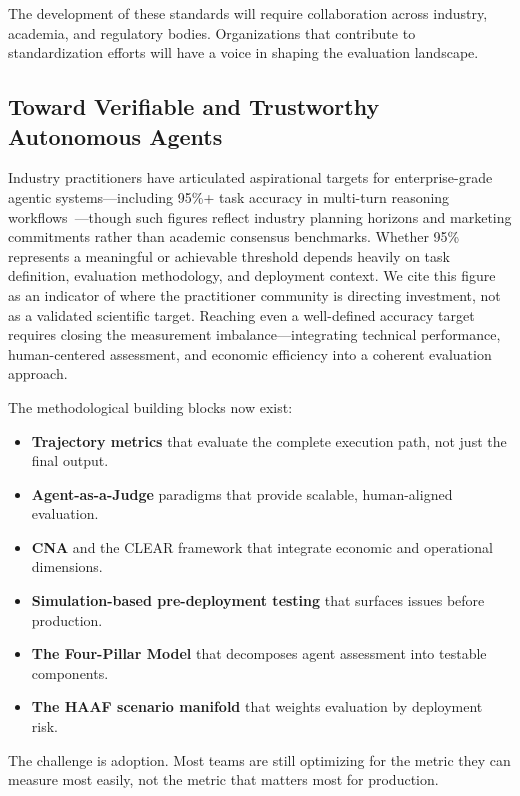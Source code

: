 The development of these standards will require collaboration across industry, academia, and regulatory bodies. Organizations that contribute to standardization efforts will have a voice in shaping the evaluation landscape.

\subsection{Toward Verifiable and Trustworthy Autonomous Agents}

Industry practitioners have articulated aspirational targets for enterprise-grade agentic systems---including 95\%+ task accuracy in multi-turn reasoning workflows~\citep{mckinsey_agentic_ai}---though such figures reflect industry planning horizons and marketing commitments rather than academic consensus benchmarks. Whether 95\% represents a meaningful or achievable threshold depends heavily on task definition, evaluation methodology, and deployment context. We cite this figure as an indicator of where the practitioner community is directing investment, not as a validated scientific target. Reaching even a well-defined accuracy target requires closing the measurement imbalance---integrating technical performance, human-centered assessment, and economic efficiency into a coherent evaluation approach.

The methodological building blocks now exist:

\begin{itemize}
    \item \textbf{Trajectory metrics} that evaluate the complete execution path, not just the final output.
    \item \textbf{Agent-as-a-Judge} paradigms that provide scalable, human-aligned evaluation.
    \item \textbf{CNA} and the CLEAR framework that integrate economic and operational dimensions.
    \item \textbf{Simulation-based pre-deployment testing} that surfaces issues before production.
    \item \textbf{The Four-Pillar Model} that decomposes agent assessment into testable components.
    \item \textbf{The HAAF scenario manifold} that weights evaluation by deployment risk.
\end{itemize}

The challenge is adoption. Most teams are still optimizing for the metric they can measure most easily, not the metric that matters most for production.


